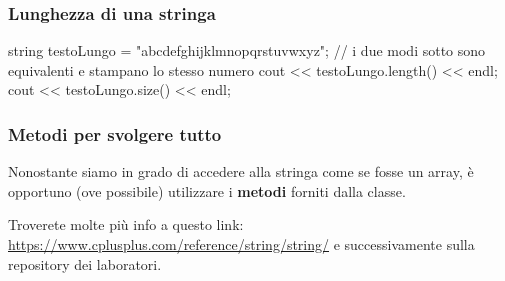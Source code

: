 \documentclass{beamer}
\begin{document}
    \begin{frame}[fragile]
        \frametitle{Lunghezza di una stringa}

        \begin{cppcode}
            string testoLungo = "abcdefghijklmnopqrstuvwxyz";
            // i due modi sotto sono equivalenti e stampano lo stesso numero
            cout << testoLungo.length() << endl;
            cout << testoLungo.size() << endl;
        \end{cppcode}

    \end{frame}

    \begin{frame}
        \frametitle{Metodi per svolgere tutto}
    
        Nonostante siamo in grado di accedere alla stringa come se fosse un array, è opportuno (ove possibile) utilizzare i \textbf{metodi} forniti dalla classe.

        Troverete molte più info a questo link: \url{https://www.cplusplus.com/reference/string/string/} e successivamente sulla repository dei laboratori.
    
    \end{frame}
\end{document}
